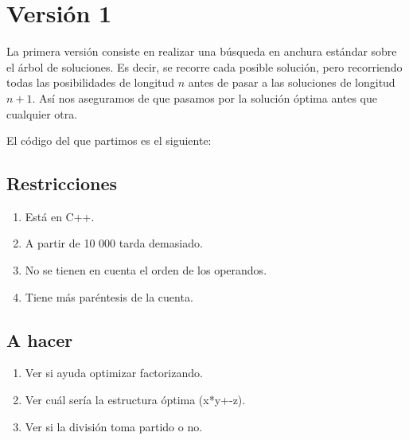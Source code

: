 \documentclass{article}
\title{}
\author{}
\date{}
\begin{document}
	
%	
%	
	
	\section{Versión 1}
	La primera versión consiste en realizar una búsqueda en anchura estándar sobre el árbol de soluciones. Es decir, se recorre cada posible solución, pero recorriendo todas las posibilidades de longitud $n$ antes de pasar a las soluciones de longitud $n+1$. Así nos aseguramos de que pasamos por la solución óptima antes que cualquier otra.
	
	El código del que partimos es el siguiente:
	
	
	
	\subsection{Restricciones}
	\begin{enumerate}
		\item Está en C++.
		\item A partir de 10 000 tarda demasiado.
		\item No se tienen en cuenta el orden de los operandos.
		\item Tiene más paréntesis de la cuenta.
	\end{enumerate}

	\subsection{A hacer}
	\begin{enumerate}
		\item Ver si ayuda optimizar factorizando.
		\item Ver cuál sería la estructura óptima (x*y+-z).
		\item Ver si la división toma partido o no.
	\end{enumerate}
\end{document}
